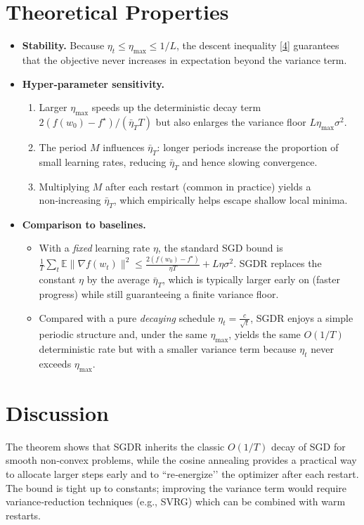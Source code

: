 \documentclass{article}
\begin{document}
\section*{Theoretical Properties}
\begin{itemize}
\item \textbf{Stability.} Because $\eta_t\le\eta_{\max}\le1/L$, the descent inequality \eqref{4} guarantees that the objective never increases in expectation beyond the variance term.
\item \textbf{Hyper‑parameter sensitivity.}
    \begin{enumerate}
        \item Larger $\eta_{\max}$ speeds up the deterministic decay term $2(f(w_0)-f^\star)/(\bar\eta_T T)$ but also enlarges the variance floor $L\eta_{\max}\sigma^2$.
        \item The period $M$ influences $\bar\eta_T$: longer periods increase the proportion of small learning rates, reducing $\bar\eta_T$ and hence slowing convergence.
        \item Multiplying $M$ after each restart (common in practice) yields a non‑increasing $\bar\eta_T$, which empirically helps escape shallow local minima.
    \end{enumerate}
\item \textbf{Comparison to baselines.}
    \begin{itemize}
        \item With a \emph{fixed} learning rate $\eta$, the standard SGD bound is 
        $\frac{1}{T}\sum_{t}\mathbb{E}\|\nabla f(w_t)\|^2\le\frac{2(f(w_0)-f^\star)}{\eta T}+L\eta\sigma^2$.
        SGDR replaces the constant $\eta$ by the average $\bar\eta_T$, which is typically larger early on (faster progress) while still guaranteeing a finite variance floor.
        \item Compared with a pure \emph{decaying} schedule $\eta_t=\frac{c}{\sqrt{t}}$, SGDR enjoys a simple periodic structure and, under the same $\eta_{\max}$, yields the same $O(1/T)$ deterministic rate but with a smaller variance term because $\eta_t$ never exceeds $\eta_{\max}$.
    \end{itemize}
\end{itemize}

\section*{Discussion}
The theorem shows that SGDR inherits the classic $O(1/T)$ decay of SGD for smooth non‑convex problems, while the cosine annealing provides a practical way to allocate larger steps early and to “re‑energize’’ the optimizer after each restart.  The bound is tight up to constants; improving the variance term would require variance‑reduction techniques (e.g., SVRG) which can be combined with warm restarts.
\end{document}
